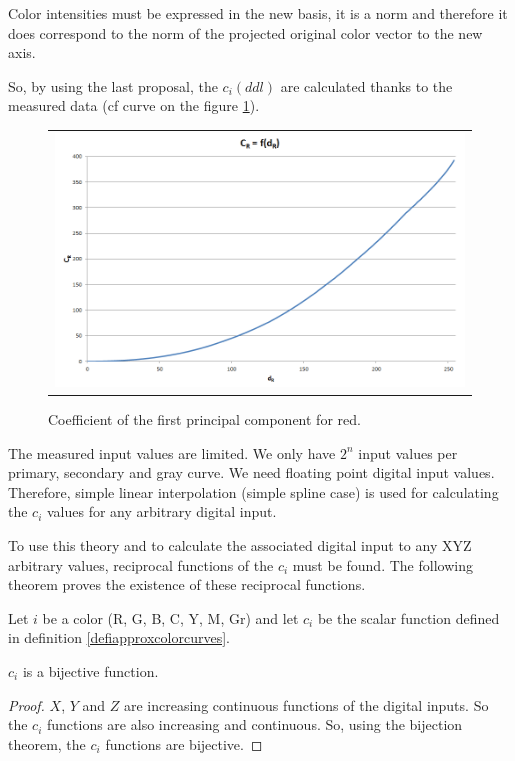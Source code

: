 Color intensities must be expressed in the new basis, it is a norm and therefore it does correspond to the norm of the projected original color vector to the new axis.

So, by using the last proposal, the $c_{i}\left(ddl\right)$ are calculated thanks to the measured data (cf curve on the figure \ref{fig_cr_dr}). 

\begin{figure}[!h]
\begin{center}
\begin{tabular}{c}
\includegraphics[width=0.6\columnwidth]{03_Rgb2XYZDisplayModule/images/cr_dr.png}
\end{tabular}
\end{center}
\caption{Coefficient of the first principal component for red.}\label{fig_cr_dr}
\end{figure}

The measured input values are limited. We only have $2^n$ input values per primary, secondary and gray curve. We need floating point digital input values. Therefore, simple linear interpolation (simple spline case) is used for calculating the $c_{i}$ values for any arbitrary digital input.\par

To use this theory and to calculate the associated digital input to any XYZ arbitrary values, reciprocal functions of the $c_{i}$ must be found. The following theorem proves the existence of these reciprocal functions.\par

\begin{theo}
Let $i$ be a color (R, G, B, C, Y, M, Gr) and let $c_{i}$ be the scalar function defined in definition \ref{defiapproxcolorcurves}.\par
$c_{i}$ is a bijective function.
\end{theo}
\begin{proof}
$X$, $Y$ and $Z$ are increasing continuous functions of the digital inputs.
So the $c_{i}$ functions are also increasing and continuous.
So, using the bijection theorem, the $c_{i}$ functions are bijective. 
\end{proof}


